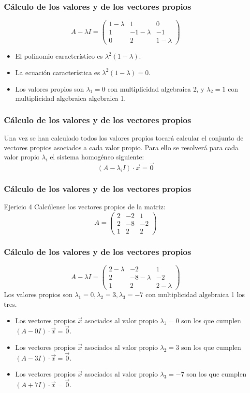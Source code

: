 \documentclass{beamer}
\begin{document}
\begin{frame}
\frametitle{C\'alculo de los valores y de los vectores propios}
\[A-\lambda I=\left(\begin{array}{ccc}1-\lambda & 1 & 0 \\1 & -1-\lambda & -1 \\0 & 2 & 1-\lambda\end{array}\right)\]
\begin{itemize}
\item El polinomio caracter\'istico es $\lambda^2 (1-\lambda)$.
\item La ecuaci\'on caracter\'istica es $\lambda^2(1-\lambda) = 0$.
\item Los valores propios son $\lambda_1=0$ con multiplicidad algebraica 2, y $\lambda_2 = 1$ con multiplicidad algebraica algebraica 1. 
\end{itemize}
\end{frame}

\begin{frame}
\frametitle{C\'alculo de los valores y de los vectores propios}
Una vez se han calculado todos los valores propios tocar\'a calcular el conjunto de vectores propios asociados a cada valor propio. Para ello se resolver\'a para cada valor propio $\lambda_i$ el sistema homog\'eneo siguiente:
\[(A - \lambda_i I) \cdot \vec x = \vec 0\]
\end{frame}

\begin{frame}
\frametitle{C\'alculo de los valores y de los vectores propios}
\begin{block}{Ejericio 4}
Calc\'ulense los vectores propios de la matriz:
\[A=\left(\begin{array}{rrr}2 & -2 & 1 \\2 & -8 & -2 \\1 & 2 & 2\end{array}\right)\]
\end{block}
\end{frame}



\begin{frame}
\frametitle{C\'alculo de los valores y de los vectores propios}
\[A-\lambda I=\left(\begin{array}{ccc}2-\lambda & -2 & 1 \\2 & -8-\lambda & -2 \\1 & 2 & 2-\lambda\end{array}\right)\]
Los valores propios son $\lambda_1=0,\lambda_2=3, \lambda_3 = -7$ con multiplicidad algebraica 1 los tres.
\begin{itemize}
\item Los vectores propios $\vec x$ asociados al valor propio $\lambda_1=0$ son los que cumplen $(A-0I)\cdot \vec x = \vec 0$.
\item Los vectores propios $\vec x$ asociados al valor propio $\lambda_2=3$ son los que cumplen $(A-3I)\cdot \vec x = \vec 0$.
\item Los vectores propios $\vec x$ asociados al valor propio $\lambda_3=-7$ son los que cumplen $(A+7I)\cdot \vec x = \vec 0$.
\end{itemize}
\end{frame}
\end{document}
